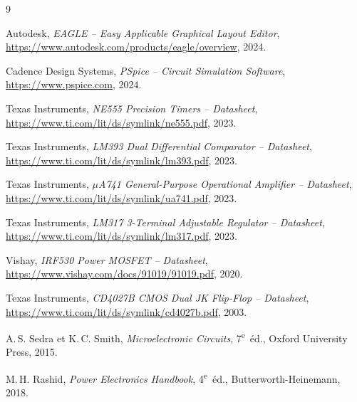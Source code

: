 \documentclass[a4paper,12pt,openany]{book}
\begin{document}
	\backmatter
	\begin{thebibliography}{9}
		
		 Autodesk,
		\textit{EAGLE -- Easy Applicable Graphical Layout Editor},
		\url{https://www.autodesk.com/products/eagle/overview}, 2024.
		
		 Cadence Design Systems,
		\textit{PSpice -- Circuit Simulation Software},
		\url{https://www.pspice.com}, 2024.
		
		 Texas Instruments,
		\textit{NE555 Precision Timers -- Datasheet},
		\url{https://www.ti.com/lit/ds/symlink/ne555.pdf}, 2023.
		
		 Texas Instruments,
		\textit{LM393 Dual Differential Comparator -- Datasheet},
		\url{https://www.ti.com/lit/ds/symlink/lm393.pdf}, 2023.
		
		 Texas Instruments,
		\textit{$\mu$A741 General-Purpose Operational Amplifier -- Datasheet},
		\url{https://www.ti.com/lit/ds/symlink/ua741.pdf}, 2023.
		
		 Texas Instruments,
		\textit{LM317 3-Terminal Adjustable Regulator -- Datasheet},
		\url{https://www.ti.com/lit/ds/symlink/lm317.pdf}, 2023.
		
		 Vishay,
		\textit{IRF530 Power MOSFET -- Datasheet},
		\url{https://www.vishay.com/docs/91019/91019.pdf}, 2020.
		
		 Texas Instruments,
		\textit{CD4027B CMOS Dual JK Flip-Flop -- Datasheet},
		\url{https://www.ti.com/lit/ds/symlink/cd4027b.pdf}, 2003.
		
		 A.\,S. Sedra et K.\,C. Smith,
		\textit{Microelectronic Circuits}, 7\textsuperscript{e}~\'ed.,
		Oxford University Press, 2015.
		
		 M.\,H. Rashid,
		\textit{Power Electronics Handbook}, 4\textsuperscript{e}~\'ed.,
		Butterworth-Heinemann, 2018.
		
	\end{thebibliography}
	
\end{document}
